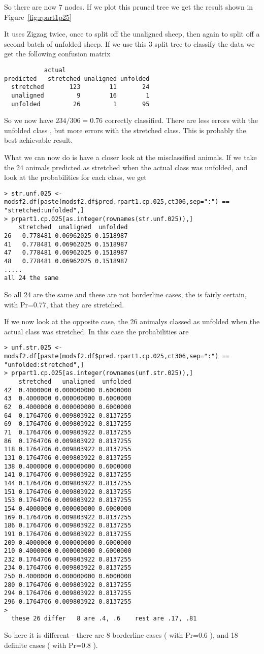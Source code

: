 \documentclass[titlepage]{article}  %
\begin{document}
So there are now 7 nodes. If we plot this pruned tree we get the result shown in Figure~\ref{fig:rpart1p25}


It uses Zigzag twice, once to split off the unaligned sheep, then again to split off a second batch of unfolded sheep.
If we use this 3 split tree to classify the data we get the following confusion matrix
\begin{verbatim}
           actual
predicted   stretched unaligned unfolded
  stretched       123        11       24
  unaligned         9        16        1
  unfolded         26         1       95
\end{verbatim}
So we now have $234/306=0.76$ correctly classified. There are less errors with the unfolded class , but more errors with the stretched class.  This is probably the best achievable result.

What we can now do is have a closer look at the misclassified animals. If we take the 24 animals predicted as stretched when the actual class was unfolded, and look at the probabilities for each class, we get
\begin{verbatim}
> str.unf.025 <- modsf2.df[paste(modsf2.df$pred.rpart1.cp.025,ct306,sep=":") == "stretched:unfolded",]
> prpart1.cp.025[as.integer(rownames(str.unf.025)),]
    stretched  unaligned  unfolded
26   0.778481 0.06962025 0.1518987
41   0.778481 0.06962025 0.1518987
47   0.778481 0.06962025 0.1518987
48   0.778481 0.06962025 0.1518987
.....
all 24 the same
\end{verbatim}
So all 24 are the same and these are not borderline cases, the is fairly certain, with Pr=0.77, that they are stretched.

If we now look at the opposite case, the 26 animalys classed as unfolded when the actual class was stretched. In this case the probabilities are
\begin{verbatim}
> unf.str.025 <- modsf2.df[paste(modsf2.df$pred.rpart1.cp.025,ct306,sep=":") == "unfolded:stretched",]
> prpart1.cp.025[as.integer(rownames(unf.str.025)),]
    stretched   unaligned  unfolded
42  0.4000000 0.000000000 0.6000000
43  0.4000000 0.000000000 0.6000000
62  0.4000000 0.000000000 0.6000000
64  0.1764706 0.009803922 0.8137255
69  0.1764706 0.009803922 0.8137255
71  0.1764706 0.009803922 0.8137255
86  0.1764706 0.009803922 0.8137255
118 0.1764706 0.009803922 0.8137255
131 0.1764706 0.009803922 0.8137255
138 0.4000000 0.000000000 0.6000000
141 0.1764706 0.009803922 0.8137255
144 0.1764706 0.009803922 0.8137255
151 0.1764706 0.009803922 0.8137255
153 0.1764706 0.009803922 0.8137255
154 0.4000000 0.000000000 0.6000000
169 0.1764706 0.009803922 0.8137255
186 0.1764706 0.009803922 0.8137255
191 0.1764706 0.009803922 0.8137255
209 0.4000000 0.000000000 0.6000000
210 0.4000000 0.000000000 0.6000000
232 0.1764706 0.009803922 0.8137255
234 0.1764706 0.009803922 0.8137255
250 0.4000000 0.000000000 0.6000000
280 0.1764706 0.009803922 0.8137255
294 0.1764706 0.009803922 0.8137255
296 0.1764706 0.009803922 0.8137255
> 
  these 26 differ   8 are .4, .6    rest are .17, .81
\end{verbatim}
So here it is different - there are 8 borderline cases ( with Pr=0.6 ), and 18 definite cases ( with Pr=0.8 ). 
\end{document}
